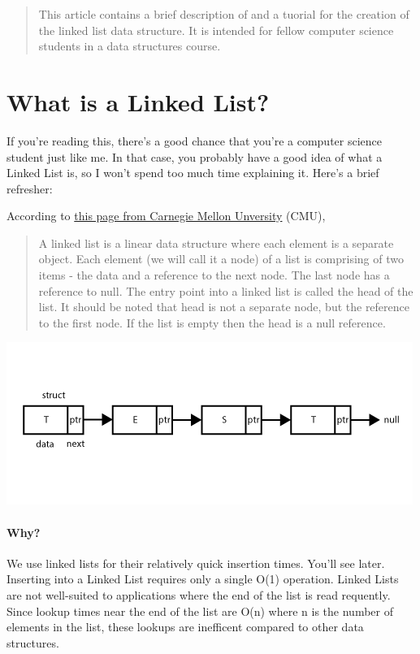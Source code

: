 \documentclass[12pt]{article}
\begin{document}
\maketitle

\begin{abstract}
	This article contains a brief description of and a tuorial for the creation of the linked list data structure. It is intended for fellow computer science students in a data structures course.
\end{abstract}

\newpage

\section{What is a Linked List?}
If you're reading this, there's a good chance that you're a computer science student just like me. In that case, you probably have a good idea of what a Linked List is, so I won't spend too much time explaining it. Here's a brief refresher:

According to \href{https://www.cs.cmu.edu/~adamchik/15-121/lectures/Linked Lists/linked lists.html}{this page from Carnegie Mellon Unversity} (CMU),

\begin{quote}
	A linked list is a linear data structure where each element is a separate object. Each element (we will call it a node) of a list is comprising of two items - the data and a reference to the next node. The last node has a reference to null. The entry point into a linked list is called the head of the list. It should be noted that head is not a separate node, but the reference to the first node. If the list is empty then the head is a null reference.
\end{quote}

\includegraphics[width=\textwidth]{linked_list_diagram}

\paragraph{Why?}
	We use linked lists for their relatively quick insertion times. You'll see later. Inserting into a Linked List requires only a single O(1) operation. Linked Lists are not well-suited to applications where the end of the list is read requently. Since lookup times near the end of the list are O(n) where n is the number of elements in the list, these lookups are inefficent compared to other data structures.
\end{document}
